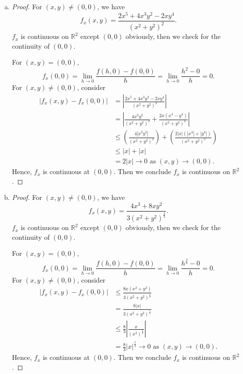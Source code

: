 \begin{Exercise}
\begin{enumerate}[a)]
\item
\begin{proof}
For $(x,y) \neq (0,0)$, we have
$$
f_x(x,y) = \frac{2x^5+4x^3y^2-2x y^4}{(x^2+y^2)^2}.
$$
$f_x$ is continuous on $\mathbb{R}^2$ except $(0,0)$ obviously, then we check for the continuity of $(0,0)$.

For $(x,y) = (0,0)$,
$$
f_x(0,0) = \lim_{h\to 0} \frac{f(h,0)-f(0,0)}{h}
= \lim_{h\to 0} \frac{h^2-0}{h}
= 0.
$$
For $(x,y) \neq (0,0)$, consider
\begin{align*}
\left| f_x(x,y) - f_x(0,0) \right|
&= \left| \frac{2x^5+4x^3y^2-2x y^4}{(x^2+y^2)^2} \right| \\
&= \left| \frac{4x^3y^2}{(x^2+y^2)^2} + \frac{2x(x^4-y^4)}{(x^2+y^2)^2} \right| \\
&\leq \left(\frac{4|x^3y^2|}{(x^2+y^2)^2} \right) + \left( \frac{2|x|(|x^4|+|y^4|)}{(x^2+y^2)^2} \right) \\
&\leq |x| + |x| \\
&= 2|x| \to 0 \text{ as } (x,y)\to(0,0).
\end{align*}
Hence, $f_x$ is continuous at $(0,0)$. Then we conclude $f_x$ is continuous on  $\mathbb{R}^2$.
\end{proof}

\item
\begin{proof}
For $(x,y) \neq (0,0)$, we have
$$
f_x(x,y) = \frac{4x^3+8x y^2}{3(x^2+y^2)^{\frac{4}{3}}}.
$$
$f_x$ is continuous on $\mathbb{R}^2$ except $(0,0)$ obviously, then we check for the continuity of $(0,0)$.

For $(x,y) = (0,0)$,
$$
f_x(0,0) = \lim_{h\to 0} \frac{f(h,0)-f(0,0)}{h}
= \lim_{h\to 0} \frac{h^{\frac{4}{3}}-0}{h}
= 0.
$$
For $(x,y) \neq (0,0)$, consider
\begin{align*}
\left| f_x(x,y) - f_x(0,0) \right|
&\leq \frac{8x(x^2+y^2)}{3(x^2+y^2)^{\frac{4}{3}}} \\
&= \frac{8|x|}{3(x^2+y^2)^{\frac{1}{3}}} \\
&\leq \frac{8}{3} \left| \frac{x}{(x^2)^{\frac{1}{3}}} \right| \\
&= \frac{8}{3} |x|^{\frac{1}{3}} \to 0 \text{ as } (x,y)\to(0,0).
\end{align*}
Hence, $f_x$ is continuous at $(0,0)$. Then we conclude $f_x$ is continuous on  $\mathbb{R}^2$.
\end{proof}
\end{enumerate}
\end{Exercise}